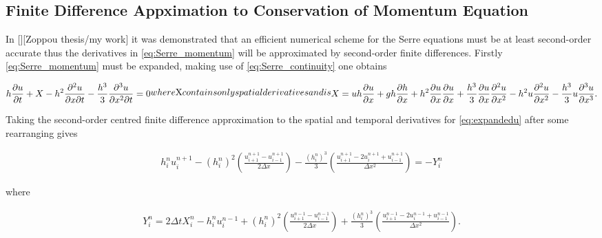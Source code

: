 \documentclass[SingleSpace,12pt,Journal]{Serre_ASCE}
\begin{document}
\subsection{Finite Difference Appximation to Conservation of Momentum Equation} 
\label{subsec:FDA2conmom}
In [][Zoppou thesis/my work] it was demonstrated that an efficient numerical scheme for the Serre equations must be at least second-order accurate thus the derivatives in \eqref{eq:Serre_momentum} will be approximated by second-order finite differences. Firstly \eqref{eq:Serre_momentum} must be expanded, making use of \eqref{eq:Serre_continuity} one obtains
\begin{linenomath*}
\begin{subequations}
\begin{gather}
h\dfrac{\partial u}{\partial t} + X - h^2\frac{\partial^2 u}{\partial x \partial t} - \frac{h^3}{3}\frac{\partial^3 u}{\partial x^2 \partial t}  =0 
\label{eq:expandedu}
\end{gather}
where $X$ contains only spatial derivatives and is
\begin{gather}
X = uh\frac{\partial u}{\partial x} + gh\frac{\partial h}{\partial x} + h^2\frac{\partial u}{\partial x}\frac{\partial u}{\partial x} + \frac{h^3}{3}\frac{\partial u}{\partial x}\frac{\partial^2 u}{\partial x^2} - h^2u\frac{\partial^2 u}{\partial x^2}- \frac{h^3}{3}u\frac{\partial^3 u}{\partial x^3} .
\end{gather}
\end{subequations}
\end{linenomath*} Taking the second-order centred finite difference approximation to the spatial and temporal derivatives for \eqref{eq:expandedu} after some rearranging gives
\begin{linenomath*}
\begin{gather}
h^{n}_iu^{n+1}_i - \left(h^{n}_i\right)^2 \left(\frac{u^{n+1}_{i+1} -u^{n+1}_{i-1} }{2 \Delta x}\right) - \frac{\left(h^{n}_i\right)^3}{3}\left(\frac{u^{n+1}_{i+1} - 2u^{n+1}_{i} + u^{n+1}_{i-1} }{\Delta x^2}\right) = - Y^n_i 
\label{eq:expandedutdisc3}
\end{gather}
\end{linenomath*}
where
\begin{linenomath*}
\begin{gather*}
Y_i^n = 2\Delta tX_i^{n} - h_i^{n}u_i^{n-1} + \left(h_i^{n}\right)^2\left(\frac{u^{n-1}_{i+1} -u^{n-1}_{i-1} }{2 \Delta x}\right) + \frac{\left(h_i^{n}\right)^3}{3}\left(\frac{u^{n-1}_{i+1} - 2u^{n-1}_{i} + u^{n-1}_{i-1} }{\Delta x^2}\right) .
\label{eq:expandfactor Xp}
\end{gather*}
\end{linenomath*}
\end{document}
